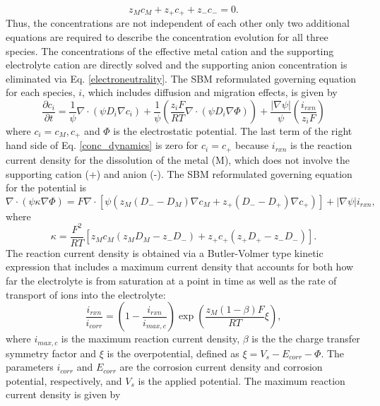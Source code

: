 \documentclass[11pt]{article}
\renewcommand{\=}[1]{\stackrel{#1}{=}} %
\theoremstyle{definition}
\theoremstyle{remark}
\begin{document}
\begin{equation}
\label{electroneutrality}
z_M c_M + z_+ c_+ + z_-c_- = 0.
 \end{equation}
Thus, the concentrations are not independent of each other only two additional equations are required to describe the concentration evolution for all three species.  The concentrations of the effective metal cation and the supporting electrolyte cation are directly solved and the supporting anion concentration is eliminated via Eq. \eqref{electroneutrality}. The SBM reformulated governing equation for each species, $i$, which includes diffusion and migration effects, is given by
\begin{equation}
\label{conc_dynamics}
\frac{\partial c_i}{\partial t}=\frac{1}{\psi} \nabla \cdot (\psi D_i \nabla c_i) + \frac{1}{\psi} \left( \frac{z_i F}{RT} \nabla \cdot (\psi D_i \nabla \Phi) \right)
+ \frac{|\nabla \psi|}{\psi} \left( \frac{i_{rxn}}{z_i F} \right)
\end{equation}
\noindent where $c_i =c_M, c_+$ and $\Phi$ is the electrostatic potential.  The last term of the right hand side of Eq. \eqref{conc_dynamics} is zero for $c_i =c_+$  because $i_{rxn}$ is the reaction current density for the dissolution of the metal (M), which does not involve the supporting cation (+) and anion (-). The SBM reformulated governing equation for the potential is
\begin{equation}
\nabla \cdot (\psi \kappa \nabla \Phi) = F \nabla \cdot \left[ \psi \left( z_M (D_- - D_M) \nabla c_M + z_+ (D_- - D_+)  \nabla c_+ \right) \right] + |\nabla \psi | i_{rxn},
\end{equation}
where 
\begin{equation}
\kappa =\frac{F^2}{RT}\left[ z_Mc_M\left( z_MD_M-z_-D_-\right) + z_+c_+\left( z_+D_+-z_-D_-\right) \right].
\end{equation}
The reaction current density is obtained via a Butler-Volmer type kinetic expression that includes a maximum current density that accounts for both how far the electrolyte is from saturation at a point in time as well as the rate of transport of ions into the electrolyte:
\begin{equation}
\frac{i_{rxn}}{i_{corr}}= \left( 1 - \frac{i_{rxn}}{i_{max,c}} \right) \exp \left( \frac{z_M (1-\beta) F}{RT}\xi \right),
\end{equation}
where $i_{max,c}$ is the maximum reaction current density, $\beta$ is the the charge transfer symmetry factor and $\xi$ is the overpotential, defined as $\xi=V_s-E_{corr}-\Phi$. The parameters $i_{corr}$ and $E_{corr}$ are the corrosion current density and corrosion potential, respectively, and $V_s$ is the applied potential. The maximum reaction current density is given by
\end{document}
